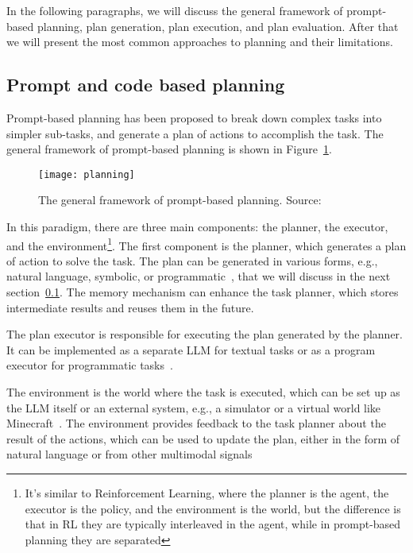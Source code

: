 In the following paragraphs, we will discuss the general framework of prompt-based planning, plan generation, plan execution, and plan evaluation.
After that we will present the most common approaches to planning and their limitations.

\subsection{Prompt and code based planning}
\label{subsec:plan-based}

Prompt-based planning has been proposed to break down complex tasks into simpler sub-tasks, and generate a plan of actions to accomplish the task.
The general framework of prompt-based planning is shown in Figure~\ref{fig:planning}.

\begin{figure}[h!]
	\centering
	\texttt{[image: planning]}
	\caption{The general framework of prompt-based planning. Source: \textcite{survey}}
	\label{fig:planning}
\end{figure}

In this paradigm, there are three main components: the planner, the executor, and the environment\footnote{It's similar to Reinforcement Learning, where the planner is the agent, the executor is the policy, and the environment is the world, but the difference is that in RL they are typically interleaved in the agent, while in prompt-based planning they are separated}.
The first component is the planner, which generates a plan of action to solve the task.
The plan can be generated in various forms, e.g., natural language, symbolic, or programmatic~\cite{gao2022pal, zhou2022least}, that we will discuss in the next section~\ref{subsec:plan-based}.
The memory mechanism can enhance the task planner, which stores intermediate results and reuses them in the future.

The plan executor is responsible for executing the plan generated by the planner.
It can be implemented as a separate LLM for textual tasks or as a program executor for programmatic tasks~\cite{wang2023plan, gao2022pal}.

The environment is the world where the task is executed, which can be set up as the LLM itself or an external system, e.g., a simulator or a virtual world like Minecraft~\cite{yao2023tree, wang2023voyager}.
The environment provides feedback to the task planner about the result of the actions, which can be used to update the plan, either in the form of natural language or from other multimodal signals~\cite{shinn2023reflexion, lu2023multimodal}

